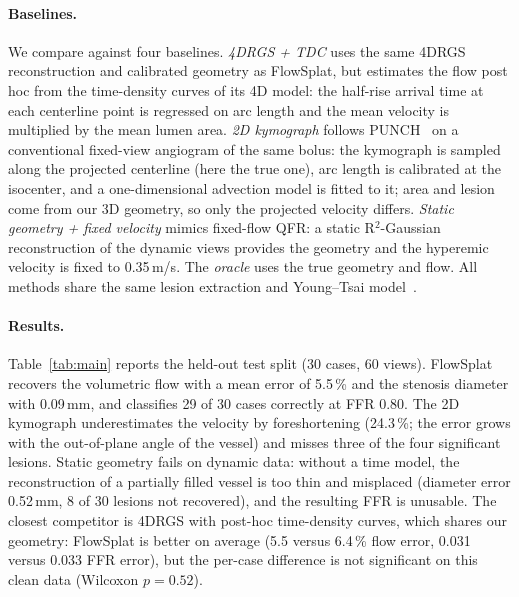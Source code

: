 
\paragraph{Baselines.}
We compare against four baselines. \emph{4DRGS + TDC} uses the same
4DRGS~\cite{liu2025fourdrgs} reconstruction and calibrated geometry as
FlowSplat, but estimates the flow post hoc from the time-density curves of
its 4D model: the half-rise arrival time at each centerline point is
regressed on arc length and the mean velocity is multiplied by the mean
lumen area. \emph{2D kymograph} follows PUNCH~\cite{thakur2026punch} on a
conventional fixed-view angiogram of the same bolus: the kymograph is
sampled along the projected centerline (here the true one), arc length is
calibrated at the isocenter, and a one-dimensional advection model is fitted
to it; area and lesion come from our 3D geometry, so only the projected
velocity differs. \emph{Static geometry + fixed velocity} mimics fixed-flow
QFR: a static R$^2$-Gaussian~\cite{zha2024r2gaussian} reconstruction of the
dynamic views provides the geometry and the hyperemic velocity is fixed to
0.35\,m/s. The \emph{oracle} uses the true geometry and flow. All methods
share the same lesion extraction and Young--Tsai model~\cite{young1973flow}.

\paragraph{Results.}
Table~\ref{tab:main} reports the held-out test split (30 cases, 60 views).
FlowSplat recovers the volumetric flow with a mean error of 5.5\,\% and the
stenosis diameter with 0.09\,mm, and classifies 29 of 30 cases correctly at
FFR 0.80. The 2D kymograph underestimates the velocity by foreshortening
(24.3\,\%; the error grows with the out-of-plane angle of the vessel) and
misses three of the four significant lesions. Static geometry fails on
dynamic data: without a time model, the reconstruction of a partially
filled vessel is too thin and misplaced (diameter error 0.52\,mm, 8 of 30
lesions not recovered), and the resulting FFR is unusable. The closest
competitor is 4DRGS with post-hoc time-density curves, which shares our
geometry: FlowSplat is better on average (5.5 versus 6.4\,\% flow error,
0.031 versus 0.033 FFR error), but the per-case difference is not
significant on this clean data (Wilcoxon $p = 0.52$).

